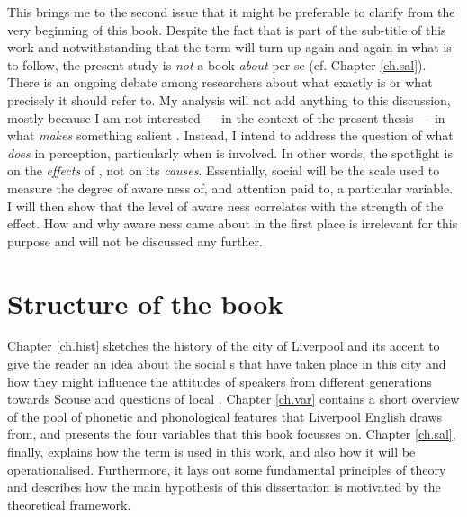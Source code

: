 This brings me to the second issue that it might be preferable to clarify from the very beginning of this book.
Despite the fact that \emph{} is part of the sub-title of this work and notwithstanding that the term will turn up again and again in what is to follow, the present study is \emph{not} a book \emph{about}  per se (cf. Chapter \ref{ch.sal}).
There is an ongoing debate among researchers about what exactly  is or what precisely it should refer to.
My analysis will not add anything to this discussion, mostly because I am not interested --- in the context of the present thesis --- in what \emph{makes} something salient .
Instead, I intend to address the question of what  \emph{does} in perception, particularly when  is involved.
In other words, the spotlight is on the \emph{effects} of , not on its \emph{causes}.
Essentially, social  will be the scale used to measure the degree of aware ness of, and attention paid to, a particular variable.
I will then show that the level of aware ness correlates with the strength of the  effect.
How and why aware ness came about in the first place is irrelevant for this purpose and will not be discussed any further.

\section{Structure of the book}
\label{sec.intro.structure}

Chapter \ref{ch.hist} sketches the history of the city of Liverpool and its accent to give the reader an idea about the social s that have taken place in this city and how they might influence the attitudes of speakers from different generations towards Scouse and questions of local .
Chapter \ref{ch.var} contains a short overview of the pool of phonetic and phonological features that Liverpool English draws from, and presents the four variables that this book focusses on.
Chapter \ref{ch.sal}, finally, explains how the term \emph{} is used in this work, and also how it will be operationalised.
Furthermore, it lays out some fundamental principles of  theory and describes how the main hypothesis of this dissertation is motivated by the theoretical framework.

